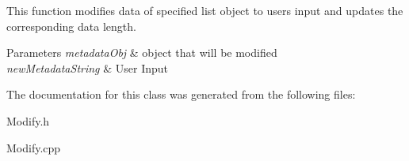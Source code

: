 This function modifies data of specified list object to user\textquotesingle{}s input and updates the corresponding data length. 


\begin{DoxyParams}{Parameters}
{\em metadata\+Obj} & object that will be modified \\
\hline
{\em new\+Metadata\+String} & User Input \\
\hline
\end{DoxyParams}


The documentation for this class was generated from the following files\+:\begin{DoxyCompactItemize}
\item 
Modify.\+h\item 
Modify.\+cpp\end{DoxyCompactItemize}
